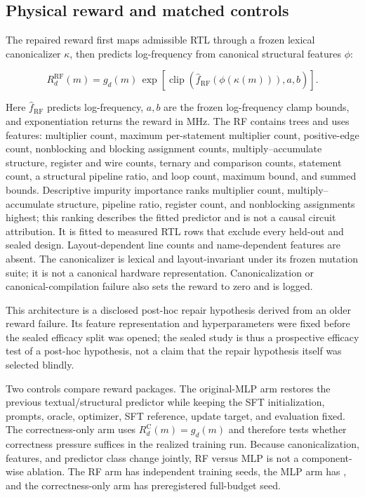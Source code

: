 \subsection{Physical reward and matched controls}

The repaired reward first maps admissible RTL through a frozen lexical
canonicalizer $\kappa$, then predicts log-frequency from canonical structural
features $\phi$:

\begin{equation}
R_d^{\mathrm{RF}}(m)=g_d(m)\,
\exp\!\left[\operatorname{clip}\!\left(
\widehat{f}_{\mathrm{RF}}(\phi(\kappa(m))),a,b\right)\right].
\label{eq:rf-reward}
\end{equation}

Here $\widehat{f}_{\mathrm{RF}}$ predicts log-frequency, $a,b$ are the frozen
log-frequency clamp bounds, and exponentiation returns the reward in MHz.
The RF contains  trees and uses
 features: multiplier count, maximum
per-statement multiplier count, positive-edge count, nonblocking and blocking
assignment counts, multiply--accumulate structure, register and wire counts,
ternary and comparison counts, statement count, a structural pipeline ratio,
and loop count, maximum bound, and summed bounds.  Descriptive impurity
importance ranks multiplier count, multiply--accumulate structure, pipeline
ratio, register count, and nonblocking assignments highest; this ranking
describes the fitted predictor and is not a causal circuit attribution.  It is fitted to
 measured RTL rows that exclude every
held-out and sealed design.  Layout-dependent line counts and name-dependent
features are absent.  The canonicalizer is lexical and layout-invariant under
its frozen mutation suite; it is not a canonical hardware representation.
Canonicalization or canonical-compilation failure also sets the reward to zero
and is logged.

This architecture is a disclosed post-hoc repair hypothesis derived from an
older reward failure.  Its feature representation and hyperparameters were
fixed before the sealed efficacy split was opened; the sealed study is thus a
prospective efficacy test of a post-hoc hypothesis, not a claim that the repair
hypothesis itself was selected blindly.

Two controls compare reward packages.  The original-MLP arm restores the
previous textual/structural predictor while keeping the SFT initialization,
prompts, oracle, optimizer, SFT reference, update target, and evaluation fixed.
The correctness-only arm uses $R_d^{\mathrm{C}}(m)=g_d(m)$ and therefore tests
whether correctness pressure suffices in the realized training run.  Because
canonicalization, features, and predictor class change jointly, RF versus MLP
is not a component-wise ablation.  The RF arm
has  independent training seeds, the MLP
arm has , and the correctness-only arm has
 preregistered full-budget seed.

